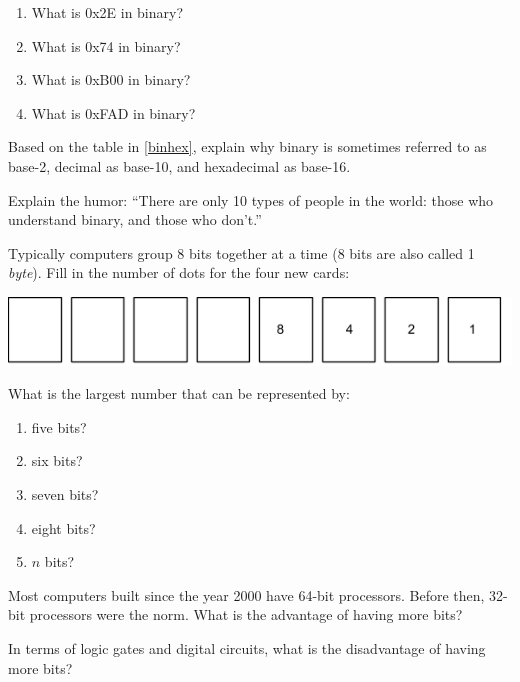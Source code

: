\begin{enumerate}
\item What is 0x2E in binary?
\item What is 0x74 in binary?
\item What is 0xB00 in binary?
\item What is 0xFAD in binary?
\end{enumerate}


\Q Based on the table in \ref{binhex}, explain why binary is sometimes referred to as base-2, decimal as base-10, and hexadecimal as base-16.

\begin{answer}
\end{answer}


\Q Explain the humor: ``There are only 10 types of people in the world: those who understand binary, and those who don't.''

\begin{answer}
\end{answer}


\Q Typically computers group 8 bits together at a time (8 bits are also called 1 \emph{byte}). Fill in the number of dots for the four new cards:

\begin{center}
\includegraphics[width=\textwidth]{CSP/binary5.png}
\end{center}


\Q What is the largest number that can be represented by:
\begin{enumerate}
\item five bits?
\item six bits?
\item seven bits?
\item eight bits?
\item $n$ bits?
\end{enumerate}


\Q Most computers built since the year 2000 have 64-bit processors. Before then, 32-bit processors were the norm. What is the advantage of having more bits?

\begin{answer}
\end{answer}


\Q In terms of logic gates and digital circuits, what is the disadvantage of having more bits?

\begin{answer}
\end{answer}
